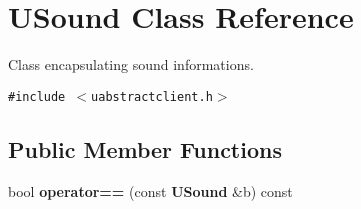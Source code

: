\section{USound Class Reference}
\label{classUSound}
Class encapsulating sound informations.  


{\tt \#include $<$uabstractclient.h$>$}

\subsection*{Public Member Functions}
\begin{CompactItemize}
\item 
bool {\bf operator==} (const {\bf USound} \&b) const \label{classUSound_a0}

\end{CompactItemize}

